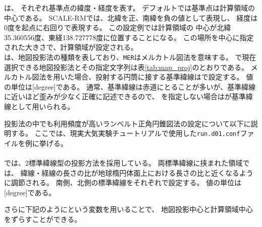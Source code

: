 \noindent
{}は、
それぞれ基準点の緯度・経度を表す。
デフォルトでは基準点は計算領域の中心である。
SCALE-RMでは、北緯を正、南緯を負の値として表現し、
経度は0度を起点に右回りで表現する。
この設定例では計算領域の
中心が北緯35.360556度、東経138.727778度に位置することになる。
この場所を中心に指定された大きさで、計算領域が設定される。\\
は、地図投影法の種類を表しており、\verb|MER|はメルカトル図法を意味する。
\scalerm で現在選択できる地図投影法とその指定文字列は表\ref{tab:map_proj}のとおりである。
メルカトル図法を用いた場合、投射する円筒に接する基準緯線はで設定する。
値の単位は[degree]である。
通常、基準緯線は赤道にとることが多いが、基準緯線に近いほど歪みが少なく正確に記述できるので、
を指定しない場合はが基準緯線として用いられる。

投影法の中でも利用頻度が高いランベルト正角円錐図法の設定について以下に説明する。
ここでは、現実大気実験チュートリアルで使用した\verb|run.d01.conf|ファイルを例に挙げる。\\

{\small {\gt
{}}}\\

\noindent
\scalerm では、2標準緯線型の投影方法を採用している。
両標準緯線に挟まれた領域では、
緯線・経線の長さの比が地球楕円体面上における長さの比と近くなるように調節される。
南側、北側の標準緯線をそれぞれで設定する。
値の単位は[degree]である。

さらに下記のようにという変数を用いることで、
地図投影中心と計算領域中心をずらすことができる。\\~\\


